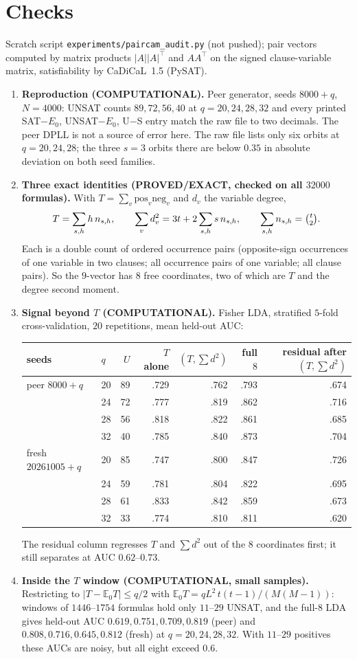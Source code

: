 \documentclass[11pt]{article}
\begin{document}
\section*{Checks}
Scratch script \texttt{experiments/paircam\_audit.py} (not pushed); pair vectors computed by matrix products $|A||A|^\top$ and $AA^\top$ on the signed clause-variable matrix, satisfiability by CaDiCaL~1.5 (PySAT).
\begin{enumerate}
\item \textbf{Reproduction (COMPUTATIONAL).} Peer generator, seeds $8000+q$, $N=4000$: UNSAT counts $89,72,56,40$ at $q=20,24,28,32$ and every printed SAT$-E_0$, UNSAT$-E_0$, U$-$S entry match the raw file to two decimals. The peer DPLL is not a source of error here. The raw file lists only six orbits at $q=20,24,28$; the three $s=3$ orbits there are below $0.35$ in absolute deviation on both seed families.
\item \textbf{Three exact identities (PROVED/EXACT, checked on all $32000$ formulas).} With $T=\sum_v \mathrm{pos}_v\mathrm{neg}_v$ and $d_v$ the variable degree,
\[ T=\sum_{s,h} h\,n_{s,h},\qquad \sum_v d_v^2=3t+2\sum_{s,h} s\,n_{s,h},\qquad \sum_{s,h}n_{s,h}=\tbinom t2. \]
Each is a double count of ordered occurrence pairs (opposite-sign occurrences of one variable in two clauses; all occurrence pairs of one variable; all clause pairs). So the $9$-vector has $8$ free coordinates, two of which are $T$ and the degree second moment.
\item \textbf{Signal beyond $T$ (COMPUTATIONAL).} Fisher LDA, stratified $5$-fold cross-validation, $20$ repetitions, mean held-out AUC:
\begin{center}
\begin{tabular}{llrrrrr}
seeds & $q$ & $U$ & $T$ alone & $(T,\sum d^2)$ & full $8$ & residual after $(T,\sum d^2)$\\\hline
peer $8000{+}q$ & 20 & 89 & .729 & .762 & .793 & .674\\
 & 24 & 72 & .777 & .819 & .862 & .716\\
 & 28 & 56 & .818 & .822 & .861 & .685\\
 & 32 & 40 & .785 & .840 & .873 & .704\\
fresh $20261005{+}q$ & 20 & 85 & .747 & .800 & .847 & .726\\
 & 24 & 59 & .781 & .804 & .822 & .695\\
 & 28 & 61 & .833 & .842 & .859 & .673\\
 & 32 & 33 & .774 & .810 & .811 & .620
\end{tabular}
\end{center}
The residual column regresses $T$ and $\sum d^2$ out of the $8$ coordinates first; it still separates at AUC $0.62$--$0.73$.
\item \textbf{Inside the $T$ window (COMPUTATIONAL, small samples).} Restricting to $|T-\mathbb E_0T|\le q/2$ with $\mathbb E_0T=qL^2\,t(t-1)/(M(M-1))$: windows of $1446$--$1754$ formulas hold only $11$--$29$ UNSAT, and the full-$8$ LDA gives held-out AUC $0.619,0.751,0.709,0.819$ (peer) and $0.808,0.716,0.645,0.812$ (fresh) at $q=20,24,28,32$. With $11$--$29$ positives these AUCs are noisy, but all eight exceed $0.6$.
\end{enumerate}
\end{document}
